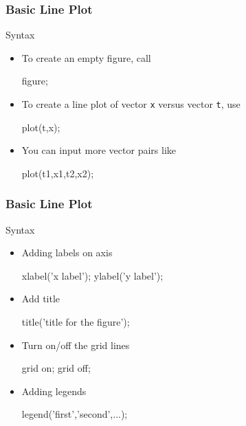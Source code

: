 \documentclass{beamer}  %
\begin{document}
\begin{frame}[fragile]
\frametitle{Basic Line Plot}

\begin{block}{Syntax}
\begin{itemize}[<+->]
    \item To create an empty figure, call
          \begin{matlabcodebeamer}[frame=none]
          figure;
          \end{matlabcodebeamer}
    \item To create a line plot of vector \texttt{x} versus vector \texttt{t}, use
          \begin{matlabcodebeamer}[frame=none]
          plot(t,x);
          \end{matlabcodebeamer}
    \item You can input more vector pairs like
          \begin{matlabcodebeamer}[frame=none]
          plot(t1,x1,t2,x2);
          \end{matlabcodebeamer}
\end{itemize}
\end{block}
\end{frame}
\begin{frame}[fragile]
\frametitle{Basic Line Plot}

\begin{block}{Syntax}
\begin{itemize}[<+->]
    \item Adding labels on axis 
          \begin{matlabcodebeamer}[frame=none]
          xlabel('x label');
          ylabel('y label');
          \end{matlabcodebeamer}
    \item Add title
          \begin{matlabcodebeamer}[frame=none]
          title('title for the figure');
          \end{matlabcodebeamer}
    \item Turn on/off the grid lines
          \begin{matlabcodebeamer}[frame=none]
          grid on;
          grid off;
          \end{matlabcodebeamer}
    \item Adding legends
          \begin{matlabcodebeamer}[frame=none]
          legend('first','second',...);
          \end{matlabcodebeamer}
\end{itemize}
\end{block}
\end{frame}
\end{document}
